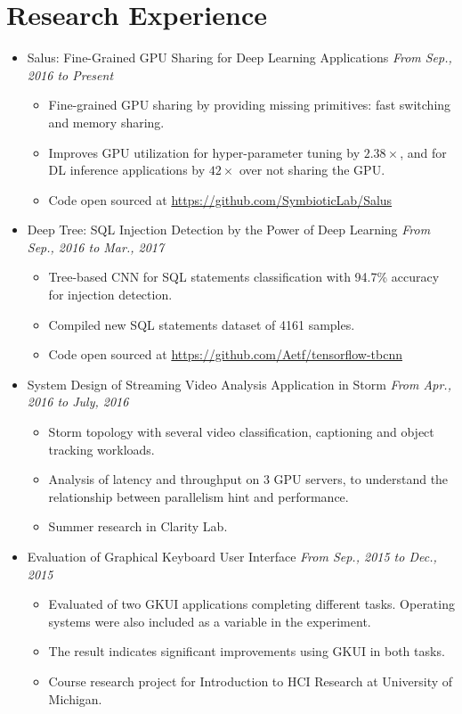 \documentclass[letterpaper,11pt]{article}
\newenvironment{extra}{}{}
\begin{document}
\section{Research Experience}
\begin{itemize}
    \item Salus: Fine-Grained GPU Sharing for Deep Learning Applications \hfill \textit{From Sep., 2016 to Present}
    \begin{itemize}
        \item Fine-grained GPU sharing by providing missing primitives: fast 
switching and memory sharing.
        \item Improves GPU utilization for hyper-parameter tuning by $2.38\times$, and for DL 
inference applications by $42\times$ over not sharing the GPU.
        \item Code open sourced at \url{https://github.com/SymbioticLab/Salus}
    \end{itemize}

    \item Deep Tree: SQL Injection Detection by the Power of Deep Learning \hfill \textit{From Sep., 2016 to Mar., 2017}
    \begin{itemize}
        \item Tree-based CNN for SQL statements classification with 94.7\% accuracy for injection 
detection.
        \item Compiled new SQL statements dataset of 4161 samples.
        \item Code open sourced at \url{https://github.com/Aetf/tensorflow-tbcnn}
    \end{itemize}

    \item System Design of Streaming Video Analysis Application in Storm \hfill \textit{From Apr., 2016 to July, 2016}
    \begin{itemize}
        \item Storm topology with several video classification, captioning and object tracking 
workloads.
        \item Analysis of latency and throughput on 3 GPU servers, to understand the relationship 
between parallelism hint and performance.
        \item Summer research in Clarity Lab.
    \end{itemize}

\begin{extra}
    \item Evaluation of Graphical Keyboard User Interface \hfill \textit{From Sep., 2015 to Dec., 2015}
    \begin{itemize}
        \item Evaluated of two GKUI applications completing different tasks. Operating systems were also
included as a variable in the experiment.
        \item The result indicates significant improvements using GKUI in both tasks.
        \item Course research project for Introduction to HCI Research at University of Michigan.
    \end{itemize}
\end{extra}


\end{itemize}
\end{document}
